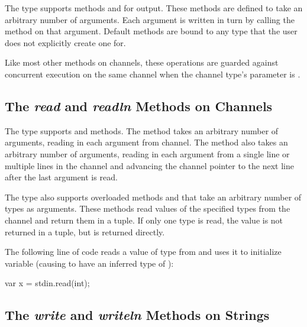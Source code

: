 The  type supports methods  and 
for output.  These methods are defined to take an arbitrary number of
arguments.  Each argument is written in turn by calling
the  method on that argument.
Default  methods are bound to any type that the user
does not explicitly create one for.

Like most other methods on channels,
these operations are guarded against concurrent execution on the same channel
when the channel type's  parameter is .


\subsection{The {\em read} and {\em readln} Methods on Channels}
\label{IO_channel_read}

The  type supports  and  methods.
The  method takes an arbitrary number of arguments, reading
in each argument from channel.  The  method also
takes an arbitrary number of arguments, reading in each argument
from a single line or multiple lines in the channel and 
advancing the channel pointer to the next line after the last argument 
is read.

The  type also supports overloaded methods 
and  that take an arbitrary number of types as arguments.
These methods read values of the specified types from the channel and
return them in a tuple.  If only one type is read, the value is not
returned in a tuple, but is returned directly.

\begin{example}
The following line of code reads a value of type  from
 and uses it to initialize variable  (causing
 to have an inferred type of ):
\begin{chapel}
var x = stdin.read(int);
\end{chapel}
\end{example}


\subsection{The {\em write} and {\em writeln} Methods on Strings}
\label{stringwrite}

